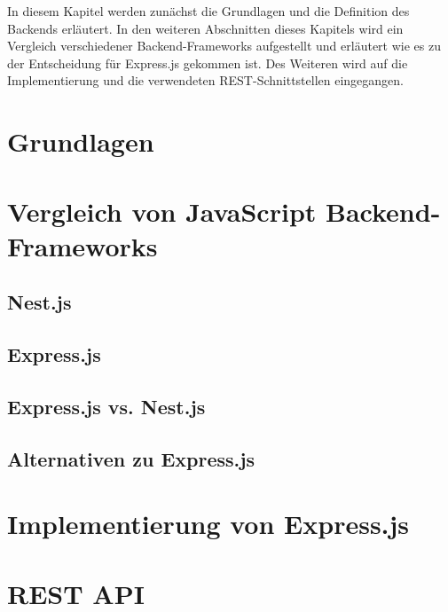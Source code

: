In diesem Kapitel werden zunächst die Grundlagen und die Definition des Backends erläutert. In den weiteren Abschnitten dieses Kapitels wird ein Vergleich verschiedener Backend-Frameworks aufgestellt und erläutert wie es zu der Entscheidung für Express.js gekommen ist. Des Weiteren wird auf die Implementierung und die verwendeten REST-Schnittstellen eingegangen.

\section{Grundlagen}


\section{Vergleich von JavaScript Backend-Frameworks}


\subsection{Nest.js}


\subsection{Express.js}


\subsection{Express.js vs. Nest.js}


\subsection{Alternativen zu Express.js}


\section{Implementierung von Express.js}


\section{REST API}



